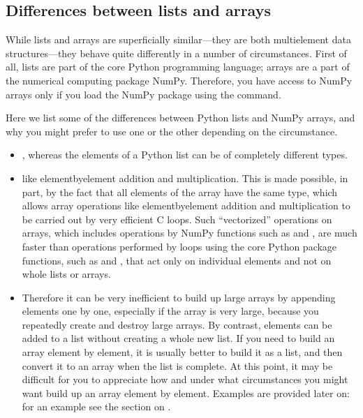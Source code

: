 \documentclass[letterpaper,10pt,english]{sphinxmanual}
\begin{document}
\subsection{Differences between lists and  arrays}
\label{\detokenize{chap3/chap3_arrays:differences-between-lists-and-arrays}}
\sphinxAtStartPar
While lists and arrays are superficially similar—they are both multi\sphinxhyphen{}element data structures—they behave quite differently in a number of circumstances.  First of all, lists are part of the core Python programming language; arrays are a part of the numerical computing package NumPy.  Therefore, you have access to NumPy arrays only if you load the NumPy package using the  command.

\sphinxAtStartPar
Here we list some of the differences between Python lists and NumPy arrays, and why you might prefer to use one or the other depending on the circumstance.
\begin{itemize}
\item {} 
\sphinxAtStartPar
{}, whereas the elements of a Python list can be of completely different types.

\item {} 
\sphinxAtStartPar
{} like element\sphinxhyphen{}by\sphinxhyphen{}element addition and multiplication.  This is made possible, in part, by the fact that all elements of the array have the same type, which allows array operations like element\sphinxhyphen{}by\sphinxhyphen{}element addition and multiplication to be carried out by very efficient C loops.  Such “vectorized” operations on arrays, which includes operations by NumPy functions such as  and , are much faster than operations performed by loops using the core Python  package functions, such as  and , that act only on individual elements and not on whole lists or arrays.

\item {} 
\sphinxAtStartPar
{}  Therefore it can be very inefficient to build up large arrays by appending elements one by one, especially if the array is very large, because you repeatedly create and destroy large arrays.  By contrast, elements can be added to a list without creating a whole new list.  If you need to build an array element by element, it is usually better to build it as a list, and then convert it to an array when the list is complete.  At this point, it may be difficult for you to appreciate how and under what circumstances you might want build up an array element by element.  Examples are provided later on: for an example see the section on {\hyperref[\detokenize{chap7/chap7_funcs:loopingarrays}]{}}.

\end{itemize}
\end{document}
